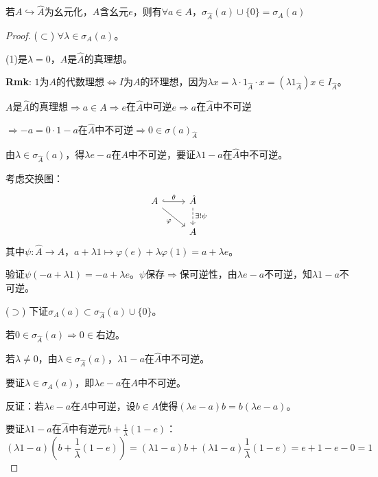 \documentclass[lang=cn,a4paper,newtx,section]{elegantbook}
\begin{document}
\begin{theorem}
  若$A \hookrightarrow \hat{A}$为幺元化，$A$含幺元$e$，则有$\forall a \in A$，$\sigma_{\hat{A}}(a) \cup \{0\} = \sigma_A(a)$
  
\end{theorem}

\begin{proof}
  ($\subset$) $\forall \lambda \in \sigma_A(a)$。
  
  (1)是$\lambda = 0$，$A$是$\hat{A}$的真理想。
  
  
  \textbf{Rmk}: $1$为$A$的代数理想$\Longleftrightarrow I$为$A$的环理想，因为$\lambda x = \lambda \cdot 1_{\hat{A}} \cdot x = (\lambda 1_{\hat{A}})x \in I_{\hat{A}}$。
  
  $A$是$\hat{A}$的真理想$\Rightarrow a \in A \Rightarrow e$在$\hat{A}$中可逆$e \Rightarrow a$在$\hat{A}$中不可逆
  
  $\Rightarrow -a = 0 \cdot 1 - a$在$\hat{A}$中不可逆$\Rightarrow 0 \in \sigma(a)_{\hat{A}}$
  
  由$\lambda \in \sigma_{\hat{A}}(a)$，得$\lambda e - a$在$A$中不可逆，要证$\lambda 1 - a$在$\hat{A}$中不可逆。
  
  考虑交换图：
  \begin{equation*}
    \begin{tikzcd}
      A \arrow[r, "\theta", hook] \arrow[dr, "\varphi"'] & \hat{A} \arrow[d, "\exists! \psi", dashed] \\
      & A
    \end{tikzcd}
  \end{equation*}
  其中$\psi: \hat{A} \to A$，$a + \lambda 1 \longmapsto \varphi(e) + \lambda \varphi(1) = a + \lambda e$。
  
  验证$\psi(-a + \lambda 1) = -a + \lambda e$。$\psi$保存$\Rightarrow$保可逆性，由$\lambda e - a$不可逆，知$\lambda 1 - a$不可逆。
  
  ($\supset$) 下证$\sigma_A(a) \subset \sigma_{\hat{A}}(a) \cup \{0\}$。
  
  若$0 \in \sigma_{\hat{A}}(a) \Rightarrow 0 \in$右边。
  
  若$\lambda \neq 0$，由$\lambda \in \sigma_{\hat{A}}(a)$，$\lambda 1 - a$在$\hat{A}$中不可逆。
  
  要证$\lambda \in \sigma_A(a)$，即$\lambda e - a$在$A$中不可逆。
  
  反证：若$\lambda e - a$在$A$中可逆，设$b \in A$使得$(\lambda e - a)b = b(\lambda e - a)$。
  
  要证$\lambda 1 - a$在$\hat{A}$中有逆元$b + \frac{1}{\lambda}(1 - e)$：
  \begin{equation*}
    (\lambda 1 - a)\left(b + \frac{1}{\lambda}(1 - e)\right) = (\lambda 1 - a)b + (\lambda 1 - a)\frac{1}{\lambda}(1 - e) = e + 1 - e - 0 = 1
  \end{equation*}
  

\end{proof}
\end{document}
